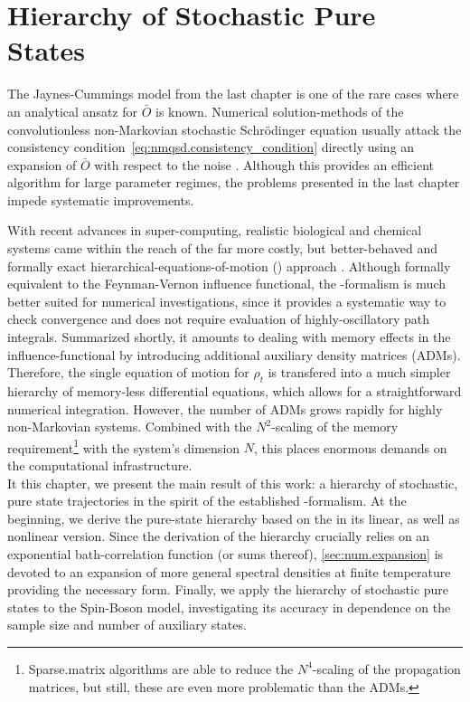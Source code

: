 \chapter{Hierarchy of Stochastic Pure States}
\label{chap:num}
%

The Jaynes-Cummings model from the last chapter is one of the rare cases where an analytical ansatz for $\bar O$ is known.
Numerical solution-methods of the convolutionless non-Markovian stochastic Schrödinger equation usually attack the consistency condition~\ref{eq:nmqsd.consistency_condition} directly using an expansion of $\bar O$ with respect to the noise \cite{YuDiGiSt99_pertubation,RiRoSt11_fmo}.
Although this provides an efficient algorithm for large parameter regimes, the problems presented in the last chapter impede systematic improvements.

With recent advances in super-computing, realistic biological and chemical systems came within the reach of the far more costly, but better-behaved and formally exact hierarchical-equations-of-motion (\HEOM) approach \cite{Ta06_stochastic}.
Although formally equivalent to the Feynman-Vernon influence functional, the \HEOM-formalism is much better suited for numerical investigations, since it provides a systematic way to check convergence and does not require evaluation of highly-oscillatory path integrals.
Summarized shortly, it amounts to dealing with memory effects in the influence-functional by introducing additional auxiliary density matrices (ADMs).
Therefore, the single equation of motion for $\rho_t$ is transfered into a much simpler hierarchy of memory-less differential equations, which allows for a straightforward numerical integration.
However, the number of ADMs grows rapidly for highly non-Markovian systems.
Combined with the $N^2$-scaling of the memory requirement\footnote{%
  Sparse.matrix algorithms are able to reduce the $N^4$-scaling of the propagation matrices, but still, these are even more problematic than the ADMs.
}
with the system's dimension $N$, this places enormous demands on the computational infrastructure.\\



It this chapter, we present the main result of this work: a hierarchy of stochastic, pure state trajectories in the spirit of the established \HEOM-formalism.
At the beginning, we derive the pure-state hierarchy based on the \NMSSE in its linear, as well as nonlinear version.
Since the derivation of the hierarchy crucially relies on an exponential bath-correlation function (or sums thereof), \autoref{sec:num.expansion} is devoted to an expansion of more general spectral densities at finite temperature providing the necessary form.
Finally, we apply the hierarchy of stochastic pure states to the Spin-Boson model, investigating its accuracy in dependence on the sample size and number of auxiliary states.


